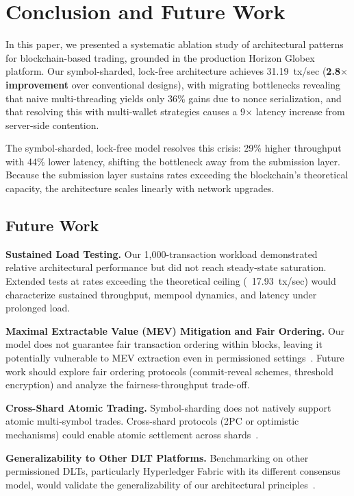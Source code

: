\section{Conclusion and Future Work}
\label{sec:conclusion}

In this paper, we presented a systematic ablation study of architectural patterns for blockchain-based trading, grounded in the production Horizon Globex platform. Our symbol-sharded, lock-free architecture achieves 31.19~tx/sec (\textbf{2.8$\times$ improvement} over conventional designs), with migrating bottlenecks revealing that naive multi-threading yields only 36\% gains due to nonce serialization, and that resolving this with multi-wallet strategies causes a 9$\times$ latency increase from server-side contention.

The symbol-sharded, lock-free model resolves this crisis: 29\% higher throughput with 44\% lower latency, shifting the bottleneck away from the submission layer. Because the submission layer sustains rates exceeding the blockchain's theoretical capacity, the architecture scales linearly with network upgrades.

\subsection{Future Work}

\textbf{Sustained Load Testing.} Our 1,000-transaction workload demonstrated relative architectural performance but did not reach steady-state saturation. Extended tests at rates exceeding the theoretical ceiling (~17.93~tx/sec) would characterize sustained throughput, mempool dynamics, and latency under prolonged load.

\textbf{Maximal Extractable Value (MEV) Mitigation and Fair Ordering.} Our model does not guarantee fair transaction ordering within blocks, leaving it potentially vulnerable to MEV extraction even in permissioned settings~\cite{qin2022mev,ji2024mev}. Future work should explore fair ordering protocols (commit-reveal schemes, threshold encryption) and analyze the fairness-throughput trade-off.

\textbf{Cross-Shard Atomic Trading.} Symbol-sharding does not natively support atomic multi-symbol trades. Cross-shard protocols (2PC or optimistic mechanisms) could enable atomic settlement across shards~\cite{zhang2023frontrunning,du2024crossshard}.

\textbf{Generalizability to Other DLT Platforms.} Benchmarking on other permissioned DLTs, particularly Hyperledger Fabric with its different consensus model, would validate the generalizability of our architectural principles~\cite{ucbas2023performance,baliga2018hyperledger}.

